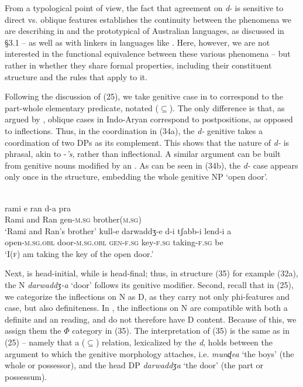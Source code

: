 \documentclass[output=paper]{langsci/langscibook}
\begin{document}
From a typological point of view, the fact that agreement on \textit{d}{}- is sensitive to direct vs. oblique features establishes the continuity between the phenomena we are describing in  and the prototypical  of Australian languages, as discussed in §3.1 – as well as with linkers in languages like . Here, however, we are not interested in the functional equivalence between these various phenomena – but rather in whether they share formal properties, including their constituent structure and the rules that apply to it.    

Following the discussion of  (25), we take genitive case in  to correspond to the part-whole elementary predicate, notated ($\subseteq$). The only difference is that, as argued by \citet{Payne1995}, oblique cases in Indo-Aryan correspond to postpositions, as opposed to inflections. Thus, in the coordination in (34a), the \textit{d-} genitive  takes a coordination of two DPs as its complement. This shows that the nature of \textit{d-} is phrasal, akin to  -\textit{’s}, rather than inflectional. A similar argument can be built from genitive nouns modified by an . As can be seen in (34b), the \textit{d-} case  appears only once in the structure, embedding the whole genitive NP ‘open door’.

\ea%
    \label{ex:manzini:34}\\
    \ea
    \gll    rami   e   ran   d-a   pra\\
              Rami   and  Ran  gen-\textsc{m.sg}  brother\textsc{(m.sg)}  \\
    \glt     ‘Rami and Ran’s brother’
    \ex  
    \gll    kull-e   darwaddʒ-e  d-i   tʃabb-i   lend-i   a  \\
             open-\textsc{m.sg.obl}   door-\textsc{m.sg.obl}  \textsc{gen-f.sg}   key-\textsc{f.sg}  taking-\textsc{f.sg}  be \\
    \glt     ‘I(\textsc{f}) am taking the key of the open door.’ 
    \z
\z

Next,  is head-initial, while  is head-final; thus, in structure (35) for example (32a), the N \textit{darwaddʒ-a} ‘door’ follows its genitive modifier. Second, recall that in  (25), we categorize the inflections on N as D, as they carry not only phi-features and case, but also definiteness. In , the inflections on N are compatible with both a definite and an  reading, and do not therefore have D content. Because of this, we assign them the $\Phi $ category in (35). The interpretation of (35) is the same as in  (25) – namely that a ($\subseteq$) relation, lexicalized by the  \textit{d}, holds between the argument to which the genitive morphology attaches, i.e. \textit{munɖea} ‘the boys’ (the whole or possessor), and the head DP \textit{darwaddʒ}\textit{a} ‘the door’ (the part or possessum).
\end{document}
